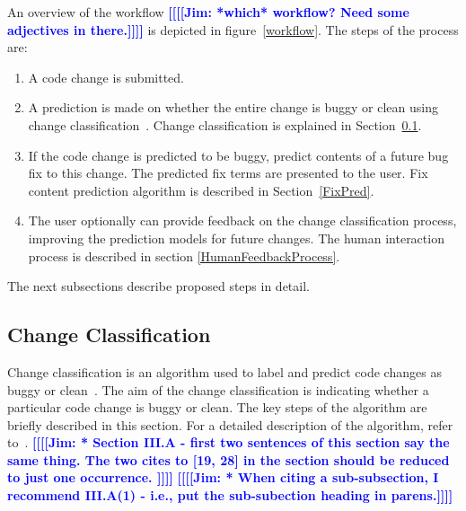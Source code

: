 \documentclass[10pt, conference, letterpaper, compsocconf]{IEEEtran}
\newcommand{\todoc}[2]{{\textcolor{#1} {\textbf{[[#2]]}}}}
\newcommand{\todoblue}[1]{\todoc{blue}{\textbf{[[#1]]}}}
\newcommand{\jim}[1]{\todoblue{Jim: #1}}
\begin{document}
An overview of the workflow \jim{*which* workflow? Need some adjectives in there.} is depicted in figure~\ref{workflow}. The steps of the process are:
\begin{enumerate}
\item A code change is submitted.
\item A prediction is made on whether the entire change is buggy or clean using change
classification~\cite{Kim2007p58, shivaji2009reducing}. Change classification is explained in Section~\ref{ChangeClassification}.
\item If the code change is predicted to be buggy, predict contents of a future bug fix to this change.
The predicted fix terms are presented to the user. Fix content prediction algorithm is described in
Section~\ref{FixPred}.
\item The user optionally can provide feedback on the change classification process, improving the prediction models for future changes. The human
interaction process is described in section \ref{HumanFeedbackProcess}.
\end{enumerate}

The next subsections describe proposed steps in detail. 

\subsection{Change Classification}
\label{ChangeClassification}
Change classification is an algorithm used to label and predict code changes as buggy or clean~\cite{Kim2007p58, shivaji2009reducing}. 
The aim of the change classification is indicating
whether a particular code change is buggy or clean.
The key steps of the algorithm are briefly described in this section.
For a detailed
description of the algorithm, refer to~\cite{Kim2007p58, shivaji2009reducing}. \jim{* Section III.A - first two sentences of this section say the same thing. The two cites to [19, 28] in the section should be reduced to just one occurrence.
}
\jim{* When citing a sub-subsection, I recommend III.A(1) - i.e., put the sub-subection heading in parens.}
\end{document}
